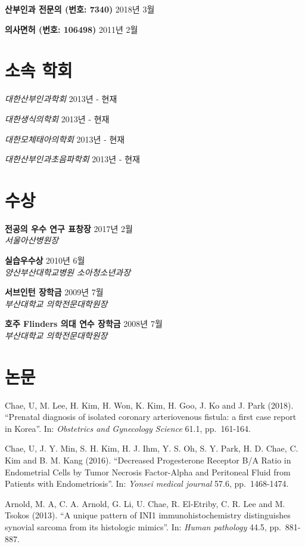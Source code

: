 \documentclass[12pt,]{article}
\begin{document}
\textbf{산부인과 전문의 (번호: 7340)} \hfill 2018년 3월

\textbf{의사면허 (번호: 106498)} \hfill 2011년 2월

\hypertarget{-}{%
\section{소속 학회}\label{-}}

\emph{대한산부인과학회} \hfill 2013년 - 현재

\emph{대한생식의학회} \hfill 2013년 - 현재

\emph{대한모체태아의학회} \hfill 2013년 - 현재

\emph{대한산부인과초음파학회} \hfill 2013년 - 현재

\pagebreak

\section{수상}

\textbf{전공의 우수 연구 표창장} \hfill 2017년 2월\\
\emph{서울아산병원장}

\textbf{실습우수상} \hfill 2010년 6월\\
\emph{양산부산대학교병원 소아청소년과장}

\textbf{서브인턴 장학금} \hfill 2009년 7월\\
\emph{부산대학교 의학전문대학원장}

\textbf{호주 Flinders 의대 연수 장학금} \hfill 2008년 7월\\
\emph{부산대학교 의학전문대학원장}

\section{논문}

Chae, U, M. Lee, H. Kim, H. Won, K. Kim, H. Goo, J. Ko and J. Park
(2018). ``Prenatal diagnosis of isolated coronary arteriovenous fistula:
a first case report in Korea''. In: \emph{Obstetrics and Gynecology
Science} 61.1, pp.~161-164.

Chae, U, J. Y. Min, S. H. Kim, H. J. Ihm, Y. S. Oh, S. Y. Park, H. D.
Chae, C. Kim and B. M. Kang (2016). ``Decreased Progesterone Receptor
B/A Ratio in Endometrial Cells by Tumor Necrosis Factor-Alpha and
Peritoneal Fluid from Patients with Endometriosis''. In: \emph{Yonsei
medical journal} 57.6, pp.~1468-1474.

Arnold, M. A, C. A. Arnold, G. Li, U. Chae, R. El-Etriby, C. R. Lee and
M. Tsokos (2013). ``A unique pattern of INI1 immunohistochemistry
distinguishes synovial sarcoma from its histologic mimics''. In:
\emph{Human pathology} 44.5, pp.~881-887.
\end{document}
